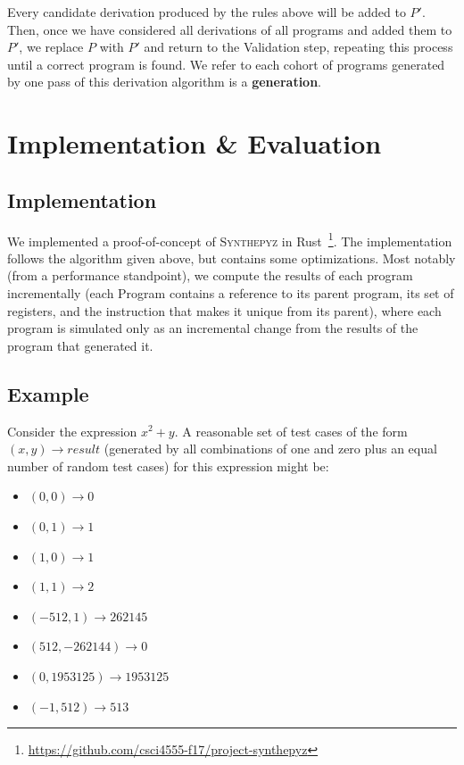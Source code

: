 \documentclass{article}
\begin{document}
Every candidate derivation produced by the rules above will be added to $P'$.
Then, once we have considered all derivations of all programs and added them to
$P'$, we replace $P$ with $P'$ and return to the Validation step, repeating
this process until a correct program is found. We refer to each cohort of
programs generated by one pass of this derivation algorithm is a
\textbf{generation}.

\section{Implementation \& Evaluation}
\label{sec:evaluation}

\subsection{Implementation}
\label{sec:implementation}

We implemented a proof-of-concept of \textsc{Synthepyz} in
Rust~\footnote{\url{https://github.com/csci4555-f17/project-synthepyz}}.
The implementation follows the algorithm given above, but contains some
optimizations.  Most notably (from a performance standpoint), we compute the
results of each program incrementally (each Program contains a reference to its
parent program, its set of registers, and the instruction that makes it unique
from its parent), where each program is simulated only as an incremental change
from the results of the program that generated it.

\subsection{Example}

Consider the expression $x^{2} + y$. A reasonable set of test cases of the form
$(x,y) \rightarrow result$ (generated by all combinations of one and zero plus
an equal number of random test cases) for this expression might be:

\begin{itemize}
    \item $(0,0) \rightarrow 0$
    \item $(0,1) \rightarrow 1$
    \item $(1,0) \rightarrow 1$
    \item $(1,1) \rightarrow 2$
    \item $(-512,1) \rightarrow 262145$
    \item $(512,-262144) \rightarrow 0$
    \item $(0,1953125) \rightarrow 1953125$
    \item $(-1,512) \rightarrow 513$
\end{itemize}
\end{document}

